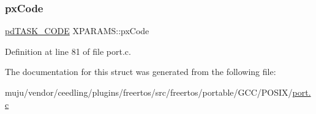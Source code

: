 \subsubsection{\texorpdfstring{px\+Code}{pxCode}}
{\footnotesize\ttfamily \hyperlink{vendor_2ceedling_2plugins_2freertos_2vendor_2freertos_2include_2_free_r_t_o_s_8h_a74cee96c96792dab96bdc57ba9007b24}{pd\+T\+A\+S\+K\+\_\+\+C\+O\+DE} X\+P\+A\+R\+A\+M\+S\+::px\+Code}



Definition at line 81 of file port.\+c.



The documentation for this struct was generated from the following file\+:\begin{DoxyCompactItemize}
\item 
muju/vendor/ceedling/plugins/freertos/src/freertos/portable/\+G\+C\+C/\+P\+O\+S\+I\+X/\hyperlink{vendor_2ceedling_2plugins_2freertos_2src_2freertos_2portable_2_g_c_c_2_p_o_s_i_x_2port_8c}{port.\+c}\end{DoxyCompactItemize}
